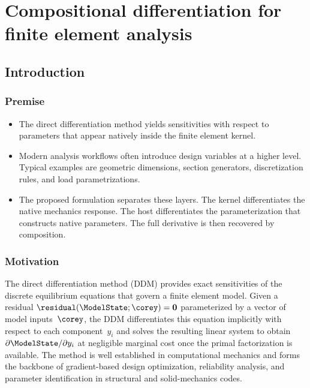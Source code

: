 

\chapter{Compositional differentiation for finite element analysis}




\section{Introduction}

\subsection{Premise}

\begin{itemize}
    \item The direct differentiation method yields sensitivities with respect to parameters that appear natively inside the finite element kernel.
    \item Modern analysis workflows often introduce design variables at a higher level. Typical examples are geometric dimensions, section generators, discretization rules, and load parametrizations.
    \item The proposed formulation separates these layers. The kernel differentiates the native mechanics response. The host differentiates the parameterization that constructs native parameters. The full derivative is then recovered by composition.
\end{itemize}


\subsection{Motivation}
The direct differentiation method (DDM) provides exact sensitivities
of the discrete equilibrium equations that govern a finite element
model. 
Given a residual $\residual(\ModelState;\corey)=\mathbf{0}$
parameterized by a vector of model inputs~$\corey$, the DDM
differentiates this equation implicitly with respect to each
component~$y_i$ and solves the resulting linear system to obtain
$\partial\ModelState/\partial y_i$ at negligible marginal cost once the
primal factorization is available.  
The method is well established in
computational mechanics and forms the backbone of gradient-based
design optimization, reliability analysis, and parameter identification
in structural and solid-mechanics codes.

